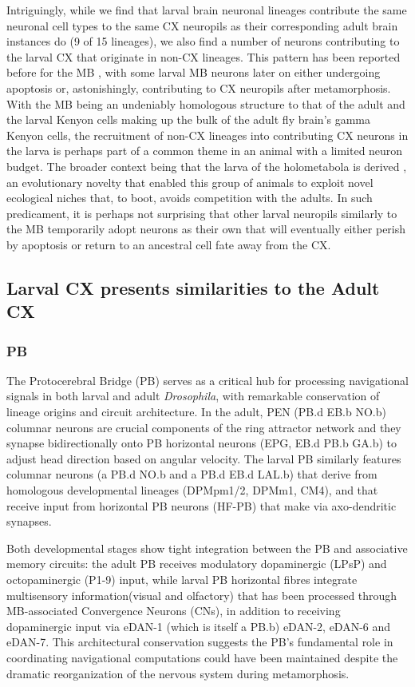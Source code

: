 Intriguingly, while we find that larval brain neuronal lineages contribute the same neuronal cell types to the same CX neuropils as their corresponding adult brain instances do (9 of 15 lineages), we also find a number of neurons contributing to the larval CX that originate in non-CX lineages. This pattern has been reported before for the MB \citep{truman2023metamorphosis}, with some larval MB neurons later on either undergoing apoptosis or, astonishingly, contributing to CX neuropils after metamorphosis. With the MB being an undeniably homologous structure to that of the adult and the larval Kenyon cells making up the bulk of the adult fly brain's gamma Kenyon cells, the recruitment of non-CX lineages into contributing CX neurons in the larva is perhaps part of a common theme in an animal with a limited neuron budget. The broader context being that the larva of the holometabola is derived \citep{truman1999origins, truman2019evolution}, an evolutionary novelty that enabled this group of animals to exploit novel ecological niches that, to boot, avoids competition with the adults.
In such predicament, it is perhaps not surprising that other larval neuropils similarly to the MB temporarily adopt neurons as their own that will eventually either perish by apoptosis or return to an ancestral cell fate away from the CX.


\subsection{Larval CX presents  similarities to the Adult CX}

        \subsubsection{PB}
        The Protocerebral Bridge (PB) serves as a critical hub for processing navigational signals in both larval and adult \textit{Drosophila}, with remarkable conservation of lineage origins and circuit architecture. In the adult, PEN (PB.d EB.b NO.b) columnar neurons are crucial components of the ring attractor network and they synapse bidirectionally onto PB horizontal neurons (EPG, EB.d PB.b GA.b) to adjust head direction based on angular velocity.  The larval PB similarly features columnar neurons (a PB.d NO.b and a PB.d EB.d LAL.b) that derive from homologous developmental lineages (DPMpm1/2, DPMm1, CM4), and that receive input from horizontal PB neurons (HF-PB) that make via axo-dendritic synapses. 

        Both developmental stages show tight integration between the PB and associative memory circuits: the adult PB receives modulatory dopaminergic (LPsP) and octopaminergic (P1-9) input, while larval PB horizontal fibres integrate multisensory information(visual and olfactory) that has been processed through MB-associated Convergence Neurons (CNs), in addition to receiving dopaminergic input via eDAN-1 (which is itself a PB.b) eDAN-2, eDAN-6 and eDAN-7. This architectural conservation suggests the PB's fundamental role in coordinating navigational computations could have been maintained despite the dramatic reorganization of the nervous system during metamorphosis. 


